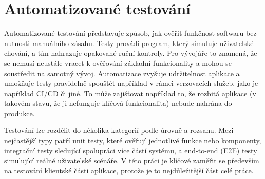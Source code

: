 

\section{Automatizované testování}

Automatizované testování představuje způsob, jak ověřit funkčnost softwaru bez nutnosti manuálního zásahu.
Testy provádí program, který simuluje uživatelské chování, a tím nahrazuje opakované ruční kontroly.
Pro vývojáře to znamená, že se nemusí neustále vracet k ověřování základní funkcionality a mohou se soustředit na samotný vývoj. 
Automatizace zvyšuje udržitelnost aplikace a umožňuje testy pravidelně spouštět například v rámci verzovacích služeb, jako je například CI/CD či jiné.
To může zajišťovat například to, že rozbitá aplikace (v takovém stavu, že ji nefunguje klíčová funkcionalita) nebude nahrána do produkce.

Testování lze rozdělit do několika kategorií podle úrovně a rozsahu. 
Mezi nejčastější typy patří unit testy, které ověřují jednotlivé funkce nebo komponenty, integrační testy sledující spolupráci více částí systému, a end-to-end (E2E) testy simulující reálné uživatelské scénáře. 
V této práci je klíčové zaměřit se především na testování klientské části aplikace, protože je to nejdůležitější část celé práce.

